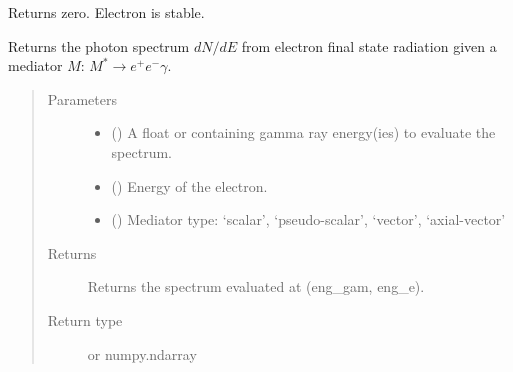 \documentclass[letterpaper,10pt,english]{sphinxmanual}
\begin{document}
\begin{fulllineitems}
\label{\detokenize{Modules:electron.decay_spectra}}
Returns zero. Electron is stable.

\end{fulllineitems}


\begin{fulllineitems}
\label{\detokenize{Modules:electron.fsr}}
Returns the photon spectrum \(dN/dE\) from electron final state radiation given a mediator \(M\): \(M^{*}\to e^{+}e^{-}\gamma\).
\begin{quote}\begin{description}
\item[{Parameters}] \leavevmode\begin{itemize}
\item {} 
 () \textendash{} A float or  containing gamma ray energy(ies) to evaluate the spectrum.

\item {} 
 () \textendash{} Energy of the electron.

\item {} 
 () \textendash{} Mediator type: ‘scalar’, ‘pseudo-scalar’, ‘vector’, ‘axial-vector’

\end{itemize}

\item[{Returns}] \leavevmode
Returns the spectrum evaluated at (eng\_gam, eng\_e).

\item[{Return type}] \leavevmode
{} or numpy.ndarray

\end{description}\end{quote}

\end{fulllineitems}
\end{document}
